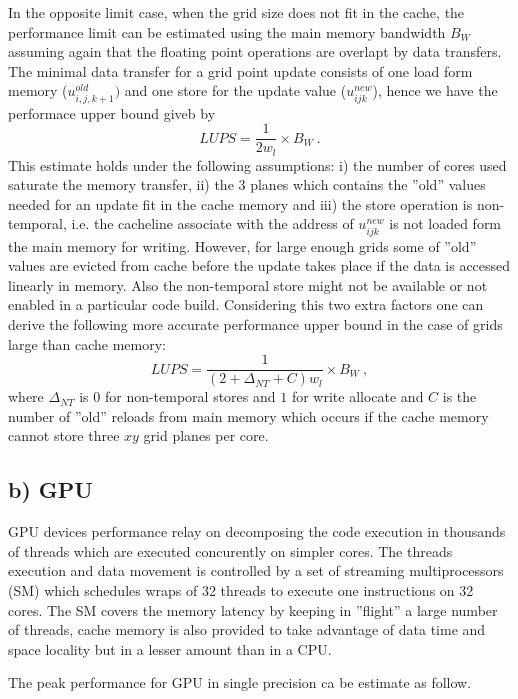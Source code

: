 \documentclass[a4paper,12pt]{article}
\begin{document}
In the opposite limit case, when the grid size does not fit in the
cache, the performance limit can be estimated using the main
memory bandwidth $B_W$ assuming again that the floating point
operations are overlapt by data transfers. The minimal data transfer
for a grid point update consists of one load form memory ($u^{old}_{i,j,k+1})$
and one store for the update value ($u^{new}_{ijk}$), hence we have
the performace upper bound giveb by
\begin{equation}
LUPS= \frac{1}{2 w_l} \times B_W \ .
\end{equation}
This estimate holds under the following assumptions: i) the number of cores
used saturate the memory transfer, ii) the 3 planes which contains the
''old'' values needed for an update fit in the cache memory and iii)
the store operation is non-temporal, i.e. the cacheline associate with the
address of $u^{new}_{ijk}$ is not loaded form the main memory for
writing. However, for
large enough grids some of ''old'' values are evicted from cache
before the update takes place if the data is accessed linearly in
memory. Also the non-temporal store might not be available or not enabled
in a particular code build. Considering this two extra factors one can
derive the following  more accurate performance upper bound in the
case of grids large than cache memory: 
\begin{equation}
LUPS=\frac{1}{(2+\Delta_{NT}+C)w_l} \times B_W  \ , 
\end{equation}
where $\Delta_{NT}$ is $0$ for non-temporal stores and $1$ for write
allocate and $C$ is the number of  ''old'' reloads from main memory
which occurs if the cache memory cannot store three $xy$ grid planes per
core.   

\subsection*{b) GPU}

GPU devices performance relay on decomposing the code execution in
thousands of threads which are executed concurently on simpler cores. The threads
execution and data movement is controlled by a set of streaming
multiprocessors (SM) which schedules wraps of 32 threads to execute
one instructions on 32 cores.  The SM covers the memory latency by
keeping in ''flight'' a large number of threads, cache memory is also
provided to take advantage of data time and space locality but in a
lesser amount than in a CPU.

The peak performance for GPU in single precision ca be estimate as
follow.
\end{document}
